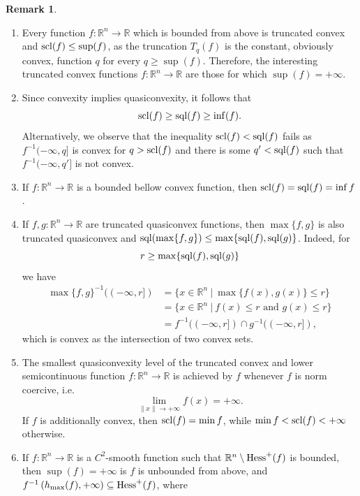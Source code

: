 \documentclass[12pt,twoside,reqno]{amsart}
\theoremstyle{definition}
\newtheorem{remark}{Remark}[section]
\numberwithin{equation}{section}
\begin{document}
\begin{remark}
\label{rem10.10.2025.1}
\begin{enumerate}
\item Every function $f:\mathbb{R}^n\longrightarrow\mathbb{R}$ which is bounded from above is truncated convex and ${\rm scl}(f)\leq \sup(f)$, as the truncation $T_q(f)$ is the constant, obviously convex, function $q$ for every $q\geq \sup(f)$. Therefore, the interesting truncated convex functions $f:\mathbb{R}^n\longrightarrow\mathbb{R}$ are those for which $\sup(f)=+\infty$.
\item Since convexity implies quasiconvexity, it follows that \[{\rm scl}(f)\geq {\rm sql}(f) \geq \inf(f).\]
Alternatively, we observe that the inequality ${\rm scl}(f)<{\rm sql}(f)$ fails as $f^{-1}(-\infty,q]$ is convex for $q>{\rm scl}(f)$ and there is some $q'<{\rm sql}(f)$
such that $f^{-1}(-\infty,q']$ is not convex.\label{rem11.01.2026.1}
\item If $f:\mathbb{R}^n\longrightarrow\mathbb{R}$ is a bounded bellow convex function, then ${\rm scl}(f)={\rm sql}(f)=\inf f$.
\item If $f,g:\mathbb{R}^n\longrightarrow\mathbb{R}$ are truncated quasiconvex functions, then 
$\max\{f,g\}$ is also truncated quasiconvex and  ${\rm sql}(\max\{f,g\})\leq \max\{ {\rm sql}(f),{\rm sql}(g)\}$. 
Indeed, for 
\[
r\geq \max\{{\rm sql}(f),{\rm sql}(g)\}
\]
we have
\begin{align}
\max\{f,g\}^{-1}((-\infty,r]) & =\{x\in\mathbb{R}^n \ | \ \max\{f(x),g(x)\}\leq r\}\nonumber\\
& = \{x\in\mathbb{R}^n \ | \ f(x)\leq r\mbox{ and }g(x)\leq r\}\nonumber\\
& =f^{-1}((-\infty,r])\cap g^{-1}((-\infty,r]),\nonumber
\end{align}
which is convex as the intersection of two convex sets.
 \item The smallest quasiconvexity level of the truncated convex and lower semicontinuous function $f:\mathbb{R}^n\longrightarrow\mathbb{R}$ is achieved by $f$ whenever $f$ is 
 norm coercive, i.e. \[\displaystyle\lim_{\|x\|\rightarrow+\infty}f(x)=+\infty.\]
 If $f$ is additionally convex, then ${\rm scl}(f)=\min f$, while $\min f<{\rm scl}(f)<+\infty$ otherwise.
\item  If $f:\mathbb{R}^n\longrightarrow\mathbb{R}$ is a $C^2$-smooth function such that $\mathbb{R}^n\setminus {\rm Hess}^+(f)$  is bounded, then $\sup(f)=+\infty$ is $f$ is unbounded from above, and
$f^{-1}\left(h_{\max}(f),+\infty\right)\subseteq {\rm Hess}^+(f)$, where 

\end{enumerate}
\end{remark}
\end{document}

